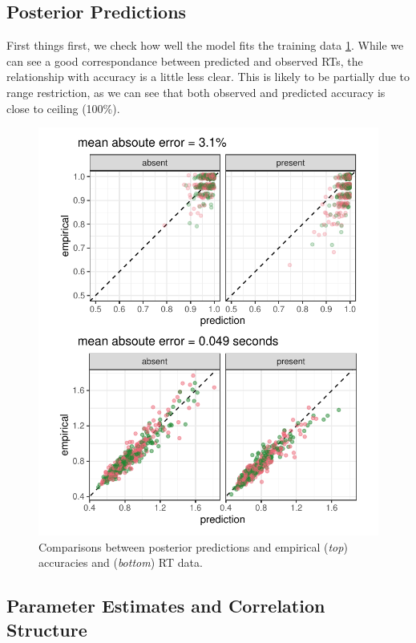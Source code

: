 \documentclass[11pt, twoside, twocolumn]{article}
\begin{document}
\subsection{Posterior Predictions}

First things first, we check how well the model fits the training data \ref{fig:lvl3_pred}. While we can see a good correspondance between predicted and observed RTs, the relationship with accuracy is a little less clear. This is likely to be partially due to range restriction, as we can see that both observed and predicted accuracy is close to ceiling (100\%). 

\begin{figure}
\centering
\includegraphics[width=\linewidth]{figs/exp_lvl_3_pred.pdf}
\caption{Comparisons between posterior predictions and empirical (\textit{top}) accuracies and (\textit{bottom}) RT data.}
\label{fig:lvl3_pred}
\end{figure}

\subsection{Parameter Estimates and Correlation Structure}
\end{document}
